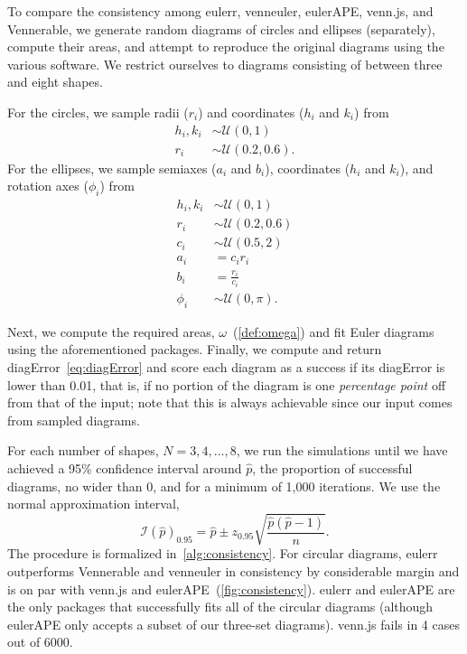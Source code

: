 \documentclass[
  oneside,
  openany,
  numbers=noendperiod,
  parskip=half,
  bibliography=totoc
]{scrbook}\usepackage[]{graphicx}\usepackage{xcolor}
\newcommand{\pkg}[1]{{\fontseries{b}\selectfont #1}}
\begin{document}
To compare the consistency among \pkg{eulerr}, \pkg{venneuler}, \pkg{eulerAPE},
\pkg{venn.js}, and \pkg{Vennerable}, we generate random diagrams of circles and
ellipses (separately), compute their areas, and attempt to reproduce the original diagrams
using the various software. We restrict ourselves to
diagrams consisting of between three and eight shapes.

For the circles, we sample radii ($r_i$) and coordinates ($h_i$ and $k_i$) from
\begin{equation}
\begin{aligned}
h_i,k_i & \sim \mathcal{U}(0, 1)\\
r_i     & \sim \mathcal{U}(0.2, 0.6).
\end{aligned}
\label{eq:consistencyCircles}
\end{equation}
For the ellipses, we sample semiaxes ($a_i$ and $b_i$), coordinates
($h_i$ and $k_i$), and rotation axes ($\phi_i$) from
\begin{equation}
\begin{aligned}
h_i,k_i & \sim \mathcal{U}(0, 1)\\
r_i     & \sim \mathcal{U}(0.2, 0.6)\\
c_i     & \sim \mathcal{U}(0.5, 2)\\
a_i     & = c_ir_i\\
b_i     & = \frac{r_i}{c_i}\\
\phi_i  & \sim \mathcal{U}(0, \pi).
\end{aligned}
\label{eq:consistencyEllipses}
\end{equation}

Next, we compute the required areas, $\omega$~(\cref{def:omega})
and fit Euler diagrams using the aforementioned packages. Finally,
we compute and return diagError~\eqref{eq:diagError} and score each
diagram as a success if its diagError is lower than 0.01, that is,
if no portion of the diagram is one \emph{percentage point} off from that of the
input; note that this is always achievable since our input comes
from sampled diagrams.



For each number of shapes, $N=3,4,\dots,8$, we run the simulations until we have
achieved a 95\% confidence interval around $\hat{p}$, the proportion of
successful diagrams, no wider than 0, and for a minimum of 1,000 iterations. We
use the normal approximation interval,
\begin{equation}
\mathcal{I}(\hat{p})_{0.95} = \hat{p} \pm z_{0.95}\sqrt{\frac{\hat{p}(\hat{p}-1)}{n}}.
\label{eq:prop-ci}
\end{equation}
The procedure is formalized in~\cref{alg:consistency}. For circular diagrams,
\pkg{eulerr} outperforms \pkg{Vennerable} and \pkg{venneuler} in
consistency by considerable margin and is on par with \pkg{venn.js} and
\pkg{eulerAPE}~(\cref{fig:consistency}). \pkg{eulerr} and \pkg{eulerAPE} are
the only packages that successfully fits all of the circular diagrams (although
\pkg{eulerAPE} only accepts a subset of our three-set diagrams).
\pkg{venn.js} fails in 4 cases out of
6000.
\end{document}
